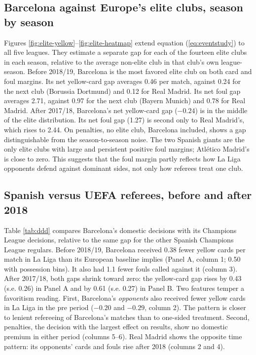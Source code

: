 \subsection{Barcelona against Europe's elite clubs, season by season}

Figures \ref{fig:elite-yellow}--\ref{fig:elite-heatmap} extend equation (\ref{eq:eventstudy}) to all five leagues. They estimate a separate gap for each of the fourteen elite clubs in each season, relative to the average non-elite club in that club's own league-season. Before 2018/19, Barcelona is the most favored elite club on both card and foul margins. Its net yellow-card gap averages 0.46 per match, against 0.24 for the next club (Borussia Dortmund) and 0.12 for Real Madrid. Its net foul gap averages 2.71, against 0.97 for the next club (Bayern Munich) and 0.78 for Real Madrid. After 2017/18, Barcelona's net yellow-card gap ($-0.24$) is in the middle of the elite distribution. Its net foul gap (1.27) is second only to Real Madrid's, which rises to 2.44. On penalties, no elite club, Barcelona included, shows a gap distinguishable from the season-to-season noise. The two Spanish giants are the only elite clubs with large and persistent positive foul margins; Atl\'etico Madrid's is close to zero. This suggests that the foul margin partly reflects how La Liga opponents defend against dominant sides, not only how referees treat one club.

\subsection{Spanish versus UEFA referees, before and after 2018}

Table \ref{tab:ddd} compares Barcelona's domestic decisions with its Champions League decisions, relative to the same gap for the other Spanish Champions League regulars. Before 2018/19, Barcelona received 0.38 fewer yellow cards per match in La Liga than its European baseline implies (Panel A, column 1; 0.50 with possession bins). It also had 1.1 fewer fouls called against it (column 3). After 2017/18, both gaps shrink toward zero: the yellow-card gap rises by 0.43 (s.e. 0.26) in Panel A and by 0.61 (s.e. 0.27) in Panel B. Two features temper a favoritism reading. First, Barcelona's \emph{opponents} also received fewer yellow cards in La Liga in the pre period ($-0.20$ and $-0.29$, column 2). The pattern is closer to lenient refereeing of Barcelona's matches than to one-sided treatment. Second, penalties, the decision with the largest effect on results, show no domestic premium in either period (columns 5--6). Real Madrid shows the opposite time pattern: its opponents' cards and fouls rise after 2018 (columns 2 and 4).


